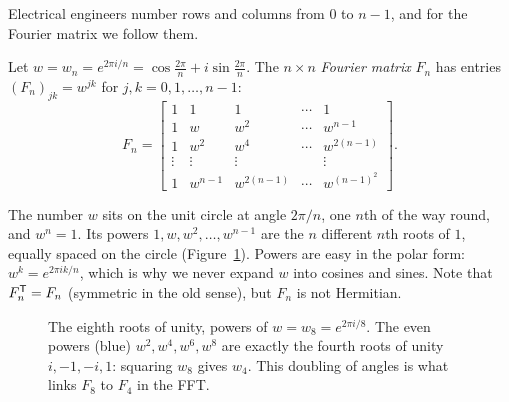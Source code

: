 Electrical engineers number rows and columns from $0$ to $n-1$, and for the Fourier matrix we
follow them.

\begin{definition}\label{def:u30-fourier}
Let $w=w_n=e^{2\pi i/n}=\cos\frac{2\pi}{n}+i\sin\frac{2\pi}{n}$. The $n\times n$ \emph{Fourier matrix}
$F_n$ has entries $(F_n)_{jk}=w^{jk}$ for $j,k=0,1,\dots,n-1$:
\[
  F_n=\begin{bmatrix}
  1&1&1&\cdots&1\\
  1&w&w^2&\cdots&w^{n-1}\\
  1&w^2&w^4&\cdots&w^{2(n-1)}\\
  \vdots&\vdots&\vdots&&\vdots\\
  1&w^{n-1}&w^{2(n-1)}&\cdots&w^{(n-1)^2}
  \end{bmatrix}.
\]
\end{definition}

The number $w$ sits on the unit circle at angle $2\pi/n$, one $n$th of the way round, and
$w^n=1$. Its powers $1,w,w^2,\dots,w^{n-1}$ are the $n$ different $n$th roots of $1$, equally
spaced on the circle (Figure~\ref{fig:u30-roots}). Powers are easy in the polar form:
$w^{k}=e^{2\pi ik/n}$, which is why we never expand $w$ into cosines and sines. Note that
$F_n^{\mathsf{T}}=F_n$ (symmetric in the old sense), but $F_n$ is not Hermitian.

\begin{figure}[ht]\centering
{}
\caption{The eighth roots of unity, powers of $w=w_8=e^{2\pi i/8}$. The even powers (blue)
$w^2,w^4,w^6,w^8$ are exactly the fourth roots of unity $i,-1,-i,1$: squaring $w_8$ gives $w_4$.
This doubling of angles is what links $F_8$ to $F_4$ in the FFT.}
\label{fig:u30-roots}
\end{figure}


